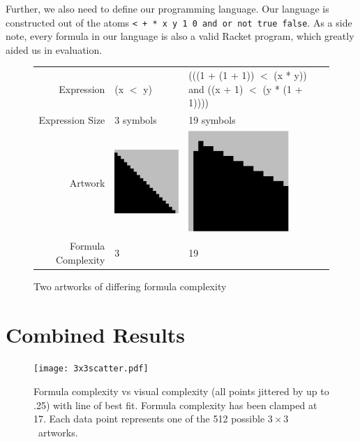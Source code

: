 \documentclass[11pt]{article}
\newcommand{\threexthree}{$3\times3$}
\begin{document}
Further, we also need to define our programming language.  Our language is
constructed out of the atoms {\tt < + * x y 1 0 and or not true false}.  As a
side note, every formula in our language is also a valid Racket
program\cite{LittleSchemer}, which greatly aided us in evaluation.  


\begin{figure}
\begin{center}
\begin{tabular}{r | p{2in}   p{2in}}
Expression & (x $<$ y) &
(((1 + (1 + 1)) $<$  (x * y)) and 
          ((x + 1) $<$ (y * (1 + 1)))) \\
Expression Size & 3 symbols & 19 symbols\\
  Artwork & \includegraphics[width=1.5in]{../presentation/simple.png} &
  \includegraphics[width=1.5in]{../presentation/complex.png} \\
Formula Complexity& 3 &
19
\end{tabular}
\end{center}

\caption{Two artworks of differing formula complexity}
\end{figure}




\section{Combined Results}

\begin{figure}
\texttt{[image: 3x3scatter.pdf]}

\caption{Formula complexity vs visual complexity  (all points jittered by up to .25) with line of best fit.  Formula complexity has been clamped at 17.  Each data point represents one of the 512 possible \threexthree\ artworks.}
\label{fig:scatter}
\end{figure}
\end{document}
